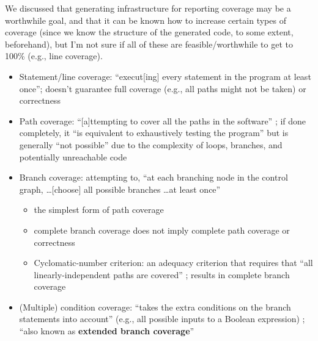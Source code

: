 We discussed that
generating infrastructure for reporting coverage may be a worthwhile goal, and
that it can be known how to increase certain types of coverage (since we know
the structure of the generated code, to some extent, beforehand), but I'm
not sure if all of these are feasible/worthwhile to get to 100\% (e.g., line
coverage).

\begin{itemize}
      \item Statement/line coverage: ``execut[ing] every statement in the
            program at least once''; doesn't guarantee full coverage
            (e.g., all paths might not be taken) \cite[p.~119]{patton_software_2006}
            or correctness \cite[p.~421]{van_vliet_software_2000}
      \item Path coverage: ``[a]ttempting to cover all the paths in the
            software'' \cite[p.~119]{patton_software_2006}; if done completely,
            it ``is equivalent to exhaustively testing the program'' but is
            generally ``not possible'' due to the complexity of loops,
            branches, and potentially unreachable code
            \cite[p.~421]{van_vliet_software_2000}
      \item Branch coverage: attempting to, ``at each branching node in the
            control graph, \dots [choose] all possible branches \dots at least
            once'' \cite[p.~421]{van_vliet_software_2000}
            \begin{itemize}
                  \item the simplest form of path coverage
                        \cite[p.~119]{patton_software_2006}
                  \item complete branch coverage does not imply complete path
                        coverage  or correctness
                        \cite[p.~421]{van_vliet_software_2000}
                  \item Cyclomatic-number criterion: an adequacy criterion that
                        requires that ``all linearly-independent paths are
                        covered'' \cite[p.~423]{van_vliet_software_2000};
                        results in complete branch coverage
            \end{itemize}
      \item (Multiple) condition coverage: ``takes the extra conditions on the
            branch statements into account'' (e.g., all possible inputs to a
            Boolean expression) \cite[p.~120]{patton_software_2006}; ``also
            known as \textbf{extended branch coverage}''
            \cite[p.~422]{van_vliet_software_2000}
\end{itemize}

